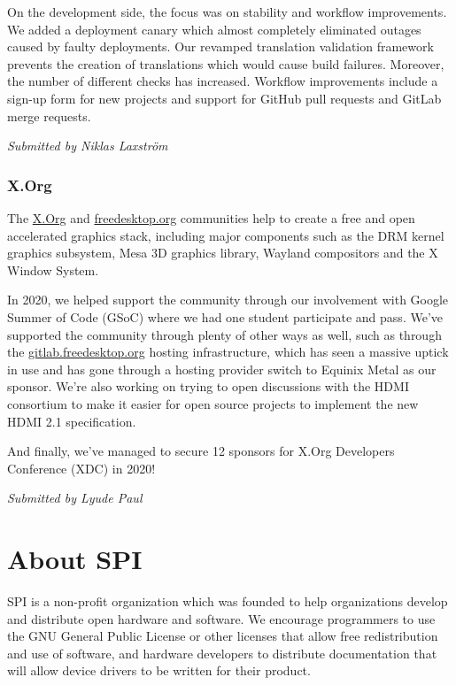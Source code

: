 \documentclass[a4paper]{report}
\begin{document}
On the development side, the focus was on stability and workflow improvements. We added a deployment canary which almost completely eliminated outages caused by faulty deployments. Our revamped translation validation framework prevents the creation of translations which would cause build failures. Moreover, the number of different checks has increased. Workflow improvements include a sign-up form for new projects and support for GitHub pull requests and GitLab merge requests.

{\em Submitted by Niklas Laxström}

\subsection{X.Org}

The \href{https://www.x.org/}{X.Org} and \href{https://www.freedesktop.org}{freedesktop.org} communities help to create a free and open accelerated graphics stack, including major components such as the DRM kernel graphics subsystem, Mesa 3D graphics library, Wayland compositors and the X Window System.

In 2020, we helped support the community through our involvement with Google Summer of Code (GSoC) where we had one student participate and pass. We've supported the community through plenty of other ways as well, such as through the \href{https://gitlab.freedesktop.org/}{gitlab.freedesktop.org} hosting infrastructure, which has seen a massive uptick in use and has gone through a hosting provider switch to Equinix Metal as our sponsor. We're also working on trying to open discussions with the HDMI consortium to make it easier for open source projects to implement the new HDMI 2.1 specification.

And finally, we've managed to secure 12 sponsors for X.Org Developers Conference (XDC) in 2020!

{\em Submitted by Lyude Paul}


\appendix
\chapter{About SPI}

SPI is a non-profit organization which was founded to help organizations develop and distribute open hardware and software. We encourage programmers to use the GNU General Public License or other licenses that allow free redistribution and use of software, and hardware developers to distribute documentation that will allow device drivers to be written for their product.
\end{document}
